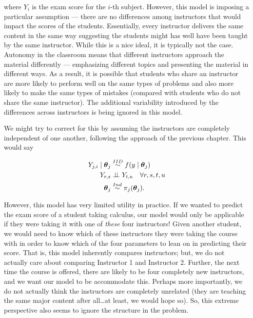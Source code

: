 \documentclass[
  letterpaper,
  DIV=11,
  numbers=noendperiod]{scrreprt}
\theoremstyle{definition}
\theoremstyle{plain}
\theoremstyle{definition}
\theoremstyle{remark}
\begin{document}
where \(Y_i\) is the exam score for the \(i\)-th subject. However, this
model is imposing a particular assumption --- there are no differences
among instructors that would impact the scores of the students.
Essentially, every instructor delivers the same content in the same way
suggesting the students might has well have been taught by the same
instructor. While this is a nice ideal, it is typically not the case.
Autonomy in the classroom means that different instructors approach the
material differently --- emphasizing different topics and presenting the
material in different ways. As a result, it is possible that students
who share an instructor are more likely to perform well on the same
types of problems and also more likely to make the same types of
mistakes (compared with students who do not share the same instructor).
The additional variability introduced by the differences across
instructors is being ignored in this model.

We might try to correct for this by assuming the instructors are
completely independent of one another, following the approach of the
previous chapter. This would say

\[
\begin{aligned}
  Y_{j, i} \mid \boldsymbol{\theta}_j &\stackrel{IID}{\sim} f(y \mid \boldsymbol{\theta}_j) \\
  Y_{r, s} &\perp\negthickspace\negmedspace\perp Y_{t, u} \quad \forall r, s, t, u \\
  \boldsymbol{\theta}_j &\stackrel{Ind}{\sim} \pi_j(\boldsymbol{\theta}_j).
\end{aligned}
\]

However, this model has very limited utility in practice. If we wanted
to predict the exam score of a student taking calculus, our model would
only be applicable if they were taking it with one of \emph{these} four
instructors! Given another student, we would need to know which of these
instructors they were taking the course with in order to know which of
the four parameters to lean on in predicting their score. That is, this
model inherently compares instructors; but, we do not actually care
about comparing Instructor 1 and Instructor 2. Further, the next time
the course is offered, there are likely to be four completely new
instructors, and we want our model to be accommodate this. Perhaps more
importantly, we do not actually think the instructors are completely
unrelated (they are teaching the same major content after all\ldots at
least, we would hope so). So, this extreme perspective also seems to
ignore the structure in the problem.
\end{document}
